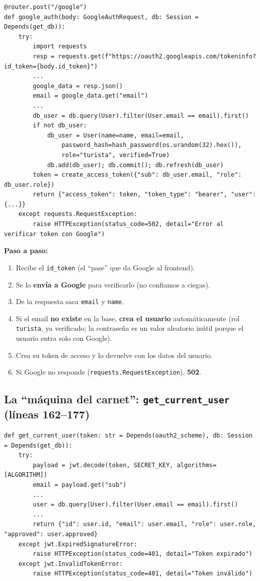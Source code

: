 \documentclass[11pt,a4paper]{article}
\begin{document}
\begin{lstlisting}
@router.post("/google")
def google_auth(body: GoogleAuthRequest, db: Session = Depends(get_db)):
    try:
        import requests
        resp = requests.get(f"https://oauth2.googleapis.com/tokeninfo?id_token={body.id_token}")
        ...
        google_data = resp.json()
        email = google_data.get("email")
        ...
        db_user = db.query(User).filter(User.email == email).first()
        if not db_user:
            db_user = User(name=name, email=email,
                password_hash=hash_password(os.urandom(32).hex()),
                role="turista", verified=True)
            db.add(db_user); db.commit(); db.refresh(db_user)
        token = create_access_token({"sub": db_user.email, "role": db_user.role})
        return {"access_token": token, "token_type": "bearer", "user": {...}}
    except requests.RequestException:
        raise HTTPException(status_code=502, detail="Error al verificar token con Google")
\end{lstlisting}

\textbf{Paso a paso:}
\begin{enumerate}
    \item Recibe el \texttt{id\_token} (el ``pase'' que da Google al frontend).
    \item Se lo \textbf{envía a Google} para verificarlo (no confiamos a ciegas).
    \item De la respuesta saca \texttt{email} y \texttt{name}.
    \item Si el email \textbf{no existe} en la base, \textbf{crea el usuario} automáticamente
    (rol \texttt{turista}, ya verificado; la contraseña es un valor aleatorio inútil porque
    el usuario entra solo con Google).
    \item Crea su token de acceso y lo devuelve con los datos del usuario.
    \item Si Google no responde (\texttt{requests.RequestException}), \textbf{502}.
\end{enumerate}

\subsection{La ``máquina del carnet'': \texttt{get\_current\_user} (líneas 162--177)}

\begin{lstlisting}
def get_current_user(token: str = Depends(oauth2_scheme), db: Session = Depends(get_db)):
    try:
        payload = jwt.decode(token, SECRET_KEY, algorithms=[ALGORITHM])
        email = payload.get("sub")
        ...
        user = db.query(User).filter(User.email == email).first()
        ...
        return {"id": user.id, "email": user.email, "role": user.role, "approved": user.approved}
    except jwt.ExpiredSignatureError:
        raise HTTPException(status_code=401, detail="Token expirado")
    except jwt.InvalidTokenError:
        raise HTTPException(status_code=401, detail="Token inválido")
\end{lstlisting}
\end{document}

